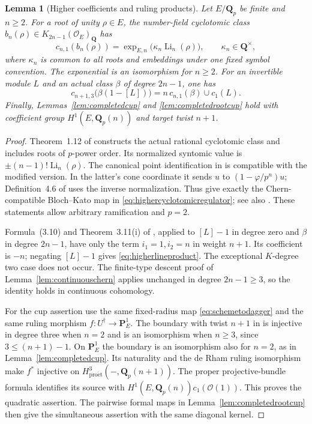 \documentclass[11pt,a4paper]{article}
\newtheorem{lemma}[theorem]{Lemma}
\theoremstyle{remark}
\newcommand{\Q}{\mathbf Q}
\newcommand{\PP}{\mathbf P}
\newcommand{\OO}{\mathcal O}
\begin{document}
\begin{lemma}[Higher coefficients and ruling products]
\label{lem:highercoefficients}
Let $E/\Q_p$ be finite and $n\geq2$.
For a root of unity $\rho\in E$, the number-field cyclotomic class
$b_n(\rho)\in K_{2n-1}(\OO_E)_{\Q}$ has
\begin{equation}\label{eq:highercyclotomicregulator}
 c_{n,1}(b_n(\rho))
 =\exp_{E,n}\bigl(\kappa_n\operatorname{Li}_n(\rho)\bigr),
 \qquad \kappa_n\in\Q^\times,
\end{equation}
where $\kappa_n$ is common to all roots and embeddings under one
fixed symbol convention. The exponential is an isomorphism for
$n\geq2$. For an invertible module $L$ and an actual class $\beta$
of degree $2n-1$, one has
\begin{equation}\label{eq:higherlineproduct}
 c_{n+1,3}\bigl(\beta(1-[L])\bigr)
 =n\,c_{n,1}(\beta)\cup c_1(L).
\end{equation}
Finally, Lemmas~\ref{lem:completedcup} and
\ref{lem:completedrootcup} hold with coefficient group
$H^1(E,\Q_p(n))$ and target twist $n+1$.
\end{lemma}
\begin{proof}
Theorem~1.12 of \cite{BesserDeJeu} constructs the actual rational
cyclotomic class and includes roots of $p$-power order.
Its normalized syntomic value is
$\pm(n-1)!\operatorname{Li}_n(\rho)$.
The canonical point identification in
\cite[Proposition~8.6(3)]{BesserRegulators} is compatible with the
modified version. In the latter's cone coordinate it sends
$u$ to $(1-\varphi/p^n)u$; Definition~4.6 of
\cite{BesserDeJeu} uses the inverse normalization.
Thus \cite[Corollary~9.10 and Proposition~9.11]{BesserRegulators}
give exactly the Chern-compatible Bloch--Kato map in
\eqref{eq:highercyclotomicregulator}; see also
\cite[Example~2.2.4 and Proposition~2.3.4]{HuberKings}.
These statements allow arbitrary ramification and $p=2$.

Formula~(3.10) and Theorem~3.11(i) of \cite{WeibelChern}, applied
to $[L]-1$ in degree zero and $\beta$ in degree $2n-1$, have only
the term $i_1=1,i_2=n$ in weight $n+1$.
Its coefficient is $-n$; negating $[L]-1$ gives
\eqref{eq:higherlineproduct}. The exceptional $K$-degree two
case does not occur. The finite-type descent proof of
Lemma~\ref{lem:continuouschern} applies unchanged in degree
$2n-1\geq3$, so the identity holds in continuous cohomology.

For the cup assertion use the same fixed-radius map
\eqref{eq:schemetodagger} and the same ruling morphism
$f:U^\dagger\to\PP^1_E$. The boundary with twist $n+1$ in
\cite[Theorem~1.3]{ColmezNiziol} is injective in degree three
when $n=2$ and is an isomorphism when $n\geq3$, since
$3\leq(n+1)-1$. On $\PP^1_E$ the boundary is an isomorphism
also for $n=2$, as in Lemma~\ref{lem:completedcup}.
Its naturality and the de Rham ruling isomorphism make
$f^*$ injective on $H^3_{\mathrm{pro\acute et}}(-,\Q_p(n+1))$.
The proper projective-bundle formula identifies its source with
$H^1(E,\Q_p(n))c_1(\OO(1))$. This proves the quadratic assertion.
The pairwise formal maps in Lemma~\ref{lem:completedrootcup}
then give the simultaneous assertion with the same diagonal kernel.
\end{proof}
\end{document}
